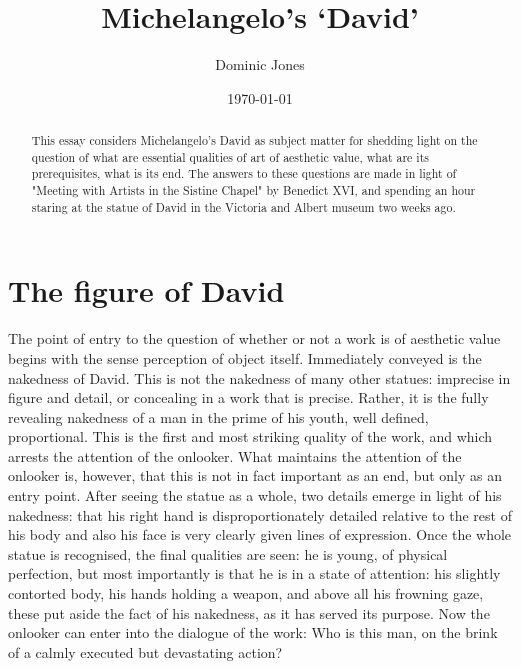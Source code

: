 \documentclass[a4paper,10pt]{article}
\title{Michelangelo's `David'}
\author{Dominic Jones}
\date{\today}
\begin{document}
\maketitle

\begin{abstract}
This essay considers Michelangelo's David as subject matter for shedding light on the question of what are essential qualities of art of  aesthetic value, what are its prerequisites, what is its end. The answers to these questions are made in light of "Meeting with Artists in the Sistine Chapel" by Benedict XVI, and spending an hour staring at the statue of David in the Victoria and Albert museum two weeks ago.
\end{abstract}

\section*{The figure of David}
The point of entry to the question of whether or not a work is of aesthetic value begins with the sense perception of object itself. Immediately conveyed is the nakedness of David. This is not the nakedness of many other statues: imprecise in figure and detail, or concealing in a work that is precise. Rather, it is the fully revealing nakedness of a man in the prime of his youth, well defined, proportional. This is the first and most striking quality of the work, and which arrests the attention of the onlooker. What maintains the attention of the onlooker is, however, that this is not in fact important as an end, but only as an entry point. After seeing the statue as a whole, two details emerge in light of his nakedness: that his right hand is disproportionately detailed relative to the rest of his body and also his face is very clearly given lines of expression. Once the whole statue is recognised, the final qualities are seen: he is young, of physical perfection, but most importantly is that he is in a state of attention: his slightly contorted body, his hands holding a weapon, and above all his frowning gaze, these put aside the fact of his nakedness, as it has served its purpose. Now the onlooker can enter into the dialogue of the work: Who is this man, on the brink of a calmly executed but devastating action?
\end{document}
